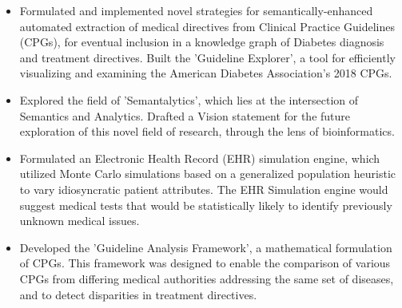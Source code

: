 \documentclass[10pt]{article}
\newcommand{\tabularxwidth}{\textwidth}
\begin{document}
\begin{minipage}{\tabularxwidth}
\begin{itemize}[noitemsep, topsep=3pt, parsep=0pt, partopsep=0pt]
                \item 
    Formulated and implemented novel strategies for semantically-enhanced automated extraction of medical directives from Clinical Practice Guidelines (CPGs), for eventual inclusion in a knowledge graph of Diabetes diagnosis and treatment directives. Built the 'Guideline Explorer', a tool for efficiently visualizing and examining the American Diabetes Association's 2018 CPGs.
            
                \item 
    Explored the field of 'Semantalytics', which lies at the intersection of Semantics and Analytics. Drafted a Vision statement for the future exploration of this novel field of research, through the lens of bioinformatics.
            
                \item 
    Formulated an Electronic Health Record (EHR) simulation engine, which utilized Monte Carlo simulations based on a generalized population heuristic to vary idiosyncratic patient attributes. The EHR Simulation engine would suggest medical tests that would be statistically likely to identify previously unknown medical issues.
            
                \item 
    Developed the 'Guideline Analysis Framework', a mathematical formulation of CPGs. This framework was designed to enable the comparison of various CPGs from differing medical authorities addressing the same set of diseases, and to detect disparities in treatment directives.
            
        \end{itemize}

        
            \vspace{.5em}
        

    \end{minipage}
    
\end{document}
